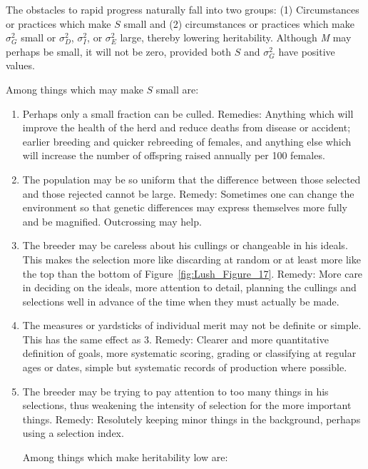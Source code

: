 The obstacles to rapid progress naturally fall into two groups: (1)
Circumstances or practices which make $S$ small and (2) circumstances
or practices which make $\sigma_G^2$ small or $\sigma_D^2$, $\sigma_I^2$, or
$\sigma_E^2$ large, thereby lowering heritability. Although \textit{M} may
perhaps be small, it will not be zero, provided both $S$ and $\sigma_G^2$
have positive values.

Among things which may make $S$ small are:
\begin{enumerate}[topsep=0pt, partopsep=0pt]
\item Perhaps only a small fraction can be culled. Remedies: Anything
which will improve the health of the herd and reduce deaths from
disease or accident; earlier breeding and quicker rebreeding of females,
and anything else which will increase the number of offspring raised
annually per 100 females.

\item The population may be so uniform that the difference between
those selected and those rejected cannot be large. Remedy: Sometimes
one can change the environment so that genetic differences may express
themselves more fully and be magnified. Outcrossing may help.

\item The breeder may be careless about his cullings or changeable in
his ideals. This makes the selection more like discarding at random or
at least more like the top than the bottom of Figure~\ref{fig:Lush_Figure_17}.
Remedy: More care in deciding on the ideals, more attention to detail, planning the
cullings and selections well in advance of the time when they must
actually be made.

\item The measures or yardsticks of individual merit may not be definite
or simple. This has the same effect as 3. Remedy: Clearer and more
quantitative definition of goals, more systematic scoring, grading or
classifying at regular ages or dates, simple but systematic records of
production where possible.

\item The breeder may be trying to pay attention to too many things
in his selections, thus weakening the intensity of selection for the more
important things. Remedy: Resolutely keeping minor things in the
background, perhaps using a selection index.

\noindent
Among things which make heritability low are:


\end{enumerate}
